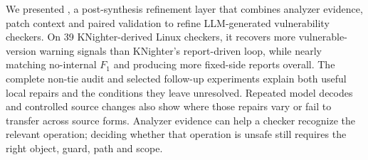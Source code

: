 We presented \toolname, a post-synthesis refinement layer that combines analyzer evidence, patch context and paired validation to refine LLM-generated vulnerability checkers.
On 39 KNighter-derived Linux checkers, it recovers more vulnerable-version warning signals than KNighter's report-driven loop, while nearly matching no-internal $F_1$ and producing more fixed-side reports overall.
The complete non-tie audit and selected follow-up experiments explain both useful local repairs and the conditions they leave unresolved.
Repeated model decodes and controlled source changes also show where those repairs vary or fail to transfer across source forms.
Analyzer evidence can help a checker recognize the relevant operation; deciding whether that operation is unsafe still requires the right object, guard, path and scope.
